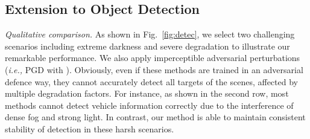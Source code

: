 \documentclass[sigconf]{acmart}
\begin{document}
\subsection{Extension to  Object Detection}


\textit{Qualitative comparison.} As shown in Fig.~\ref{fig:detec}, we select two challenging scenarios including extreme darkness  and severe degradation to illustrate our remarkable  performance. We also apply imperceptible adversarial perturbations (\textit{i.e.,} PGD with ). Obviously, even if these methods are trained in an adversarial defence way, they cannot accurately detect all targets of the scenes, affected by multiple degradation factors. For instance, as shown in the second row, most methods cannot detect vehicle information correctly due to the interference of dense fog and strong light. In contrast, our method is able to maintain consistent stability of detection in these harsh scenarios.
\end{document}
